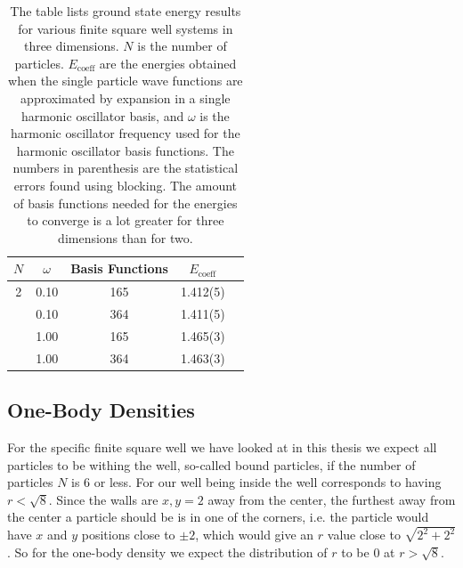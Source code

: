 \documentclass[../main.tex]{subfiles}
\begin{document}
\begin{table}[!ht]
  \centering
  \begin{tabular}{c c c c c}
    \hline
    \hline
    $N$ & $\omega$ & Basis Functions & $E_\textrm{coeff}$ \\*
    \hline
    2 & 0.10 & 165 & 1.412(5) \\*
      & 0.10 & 364 & 1.411(5) \\*
      & 1.00 & 165 & 1.465(3) \\*
      & 1.00 & 364 & 1.463(3) \\*
    \hline
    \hline
  \end{tabular}
  \caption{The table lists ground state energy results for various finite square well systems in three dimensions. $N$ is the number of particles. $E_\textrm{coeff}$ are the energies obtained when the single particle wave functions are approximated by expansion in a single harmonic oscillator basis, and $\omega$ is the harmonic oscillator frequency used for the harmonic oscillator basis functions. The numbers in parenthesis are the statistical errors found using blocking. The amount of basis functions needed for the energies to converge is a lot greater for three dimensions than for two.}
  \label{tab: EnergiesFSW3D}
\end{table}

\subsection{One-Body Densities}

For the specific finite square well we have looked at in this thesis we expect all particles to be withing the well, so-called bound particles, if the number of particles $N$ is $6$ or less. For our well being inside the well corresponds to having $r<\sqrt{8}$. Since the walls are $x,y = 2$ away from the center, the furthest away from the center a particle should be is in one of the corners, i.e. the particle would have $x$ and $y$ positions close to $\pm 2$, which would give an $r$ value close to $\sqrt{2^2 + 2^2}$. So for the one-body density we expect the distribution of $r$ to be $0$ at $r>\sqrt{8}$. 
\end{document}
